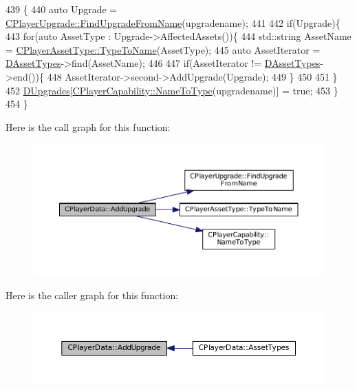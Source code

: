 \begin{DoxyCode}
439                                                         \{
440     \textcolor{keyword}{auto} Upgrade = \hyperlink{classCPlayerUpgrade_af47a08aba3a1a5b2cefacef24065a82e}{CPlayerUpgrade::FindUpgradeFromName}(upgradename);
441     
442     \textcolor{keywordflow}{if}(Upgrade)\{
443         \textcolor{keywordflow}{for}(\textcolor{keyword}{auto} AssetType : Upgrade->AffectedAssets())\{
444             std::string AssetName = \hyperlink{classCPlayerAssetType_a66ce89c35b74940e9fc947a1f4b9e770}{CPlayerAssetType::TypeToName}(AssetType);
445             \textcolor{keyword}{auto} AssetIterator = \hyperlink{classCPlayerData_ad922f283c60b1c885dac955815ae2b05}{DAssetTypes}->find(AssetName);
446             
447             \textcolor{keywordflow}{if}(AssetIterator != \hyperlink{classCPlayerData_ad922f283c60b1c885dac955815ae2b05}{DAssetTypes}->end())\{
448                 AssetIterator->second->AddUpgrade(Upgrade);
449             \}
450             
451         \}
452         \hyperlink{classCPlayerData_ae7cb90c31ec46b65ba88485368a4b96a}{DUpgrades}[\hyperlink{classCPlayerCapability_a920a696526e8a839f728192aea0ba1c5}{CPlayerCapability::NameToType}(upgradename)] = \textcolor{keyword}{true};
453     \}
454 \}
\end{DoxyCode}
Here is the call graph for this function\+:
\nopagebreak
\begin{figure}[H]
\begin{center}
\leavevmode
\includegraphics[width=350pt]{classCPlayerData_ae66fe7d594267990adf34f9286925efb_cgraph}
\end{center}
\end{figure}
Here is the caller graph for this function\+:
\nopagebreak
\begin{figure}[H]
\begin{center}
\leavevmode
\includegraphics[width=350pt]{classCPlayerData_ae66fe7d594267990adf34f9286925efb_icgraph}
\end{center}
\end{figure}
\hypertarget{classCPlayerData_a058ba3a3acf824fe4707d5e8a5024806}{}\label{classCPlayerData_a058ba3a3acf824fe4707d5e8a5024806} 
